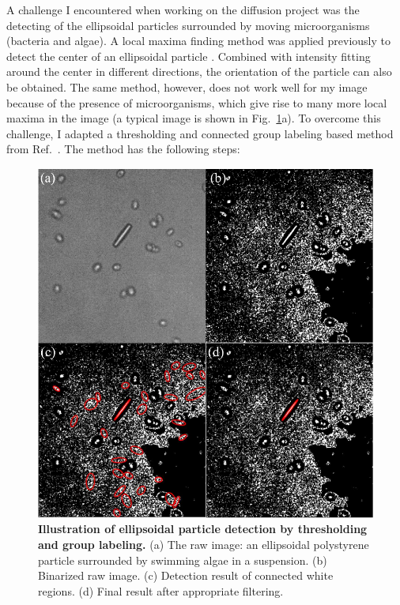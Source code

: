 A challenge I encountered when working on the diffusion project was the detecting of the ellipsoidal particles surrounded by moving microorganisms (bacteria and algae). A local maxima finding method was applied previously to detect the center of an ellipsoidal particle \cite{Han2006}. Combined with intensity fitting around the center in different directions, the orientation of the particle can also be obtained. The same method, however, does not work well for my image because of the presence of microorganisms, which give rise to many more local maxima in the image (a typical image is shown in Fig.~\ref{fig:2-5}a). To overcome this challenge, I adapted a thresholding and connected group labeling based method from Ref.~\cite{custom-feature-detection, Sauret2015, Cappello2015}. The method has the following steps:

\begin{figure}[hp]
	\begin{center}
	\includegraphics[width=5 in]{Figs/2-Exp/5.pdf}
	\end{center}
	\caption[Illustration of Ellipsoidal Particle Detection by Thresholding and Group Labeling]
	{
	\textbf{Illustration of ellipsoidal particle detection by thresholding and group labeling.}
	(a) The raw image: an ellipsoidal polystyrene particle surrounded by swimming algae in a suspension.
	(b) Binarized raw image.
	(c) Detection result of connected white regions.
	(d) Final result after appropriate filtering.
	}
	\label{fig:2-5}
\end{figure}

